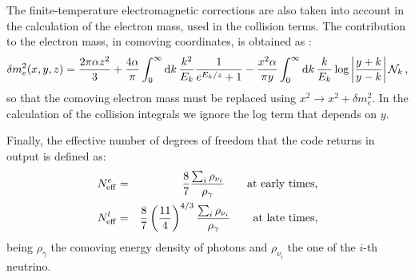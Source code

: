 \documentclass[notitlepage,showpacs,preprintnumbers,amsmath,amssymb,superscriptaddress,prd,onecolumn]{revtex4-1}
\newcommand{\Neff}{\ensuremath{N_{\rm eff}}}
\begin{document}
The finite-temperature electromagnetic corrections are also taken into account in the calculation
of the electron mass, used in the collision terms.
The contribution to the electron mass, in comoving coordinates, is obtained as \cite{Fornengo:1997wa,Mangano:2001iu,Bennett:2019ewm}:
\begin{equation}
\delta m_e^2(x, y, z)
=
\frac{2\pi\alpha z^2}{3}
+
\frac{4\alpha}{\pi}
\int_0^\infty{\rm d}k\,
\frac{k^2}{E_k}
\frac{1}{e^{E_k/z}+1}
-
\frac{x^2\alpha}{\pi y}
\int_0^\infty{\rm d}k\,
\frac{k}{E_k}
\log\left|\frac{y+k}{y-k}\right|
\mathcal{N}_k
\,,
\end{equation}
so that the comoving electron mass must be replaced using $x^2\rightarrow x^2+\delta m_e^2$.
In the calculation of the collision integrals we ignore the log term that depends on $y$.

Finally, the effective number of degrees of freedom that the code returns in output is defined as:
\begin{eqnarray}
\Neff^e
&=&
\frac{8}{7}
\frac{\sum_i \rho_{\nu_i}}{\rho_\gamma}
\qquad\text{at early times,}
\\
\Neff^l
&=&
\frac{8}{7}
\left(\frac{11}{4}\right)^{4/3}
\frac{\sum_i \rho_{\nu_i}}{\rho_\gamma}
\qquad\text{at late times,}
\end{eqnarray}
being $\rho_\gamma$ the comoving energy density of photons and
$\rho_{\nu_i}$ the one of the $i$-th neutrino.
\end{document}
